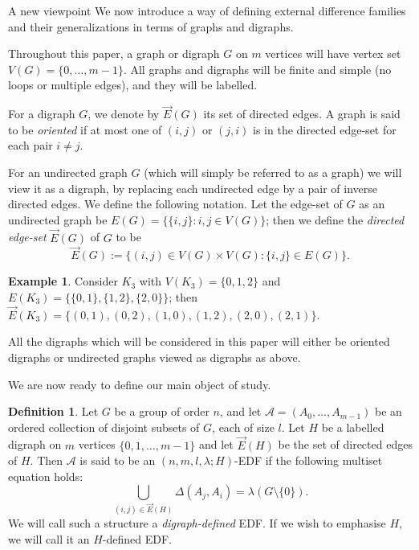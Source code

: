 \documentclass[12pt, a4paper]{article}
\theoremstyle{definition}
\newtheorem{example}[theorem]{Example}
\newtheorem{definition}[theorem]{Definition}
\newcommand{\E}{\overrightarrow{E}}
\begin{document}
\begin{section}{A new viewpoint}
We now introduce a way of defining external difference families and their generalizations in terms of graphs and digraphs.

Throughout this paper, a graph or digraph $G$ on $m$ vertices will have vertex set $V(G)=\{0,\ldots,m-1\}$.  All graphs and digraphs will be finite and simple (no loops or multiple edges), and they will be labelled.

For a digraph $G$, we denote by $\E(G)$ its set of directed edges.   A graph is said to be \emph{oriented} if at most one of $(i,j)$ or $(j,i)$ is in the directed edge-set for each pair $i \neq j$.  

For an undirected graph $G$ (which will simply be referred to as a graph) we will view it as a digraph, by replacing each undirected edge by a pair of inverse directed edges.   We define the following notation.  Let the edge-set of $G$ as an undirected graph be $E(G)=\{ \{i,j\}: i,j \in V(G) \}$; then we define the \emph{directed edge-set} $\E(G)$ of $G$ to be 
$$ \E(G):=\{ (i,j) \in V(G) \times V(G): \{i,j\} \in E(G)\}.$$

\begin{example}
Consider $K_3$ with $V(K_3)=\{0,1,2\}$ and $E(K_3)=\{ \{0,1\}, \{1,2\}, \{2,0\} \}$; then $\E(K_3)=\{(0,1), (0,2), (1,0), (1,2), (2,0), (2,1)\}$.  
\end{example}

All the digraphs which will be considered in this paper will either be oriented digraphs or undirected graphs viewed as digraphs as above.

We are now ready to define our main object of study.

\begin{definition}\label{def:H-defined EDF}
Let $G$ be a group of order $n$, and let $\mathcal{A}=(A_0,\ldots,A_{m-1})$ be an ordered collection of disjoint subsets of $G$, each of size $l$.  Let $H$ be a labelled digraph on $m$ vertices $\{0,1,\ldots,m-1\}$ and let $\E(H)$ be the set of directed edges of $H$.  Then $\mathcal{A}$ is said to be an $(n,m,l,\lambda; H)$-EDF if the following multiset equation holds:
$$ \bigcup_{(i,j) \in \E(H)} \Delta(A_j,A_i) = \lambda (G \setminus \{0\}).$$
We will call such a structure a \emph{digraph-defined} EDF.  If we wish to emphasise $H$, we will call it an $H$-defined EDF.
\end{definition}


\end{section}
\end{document}
